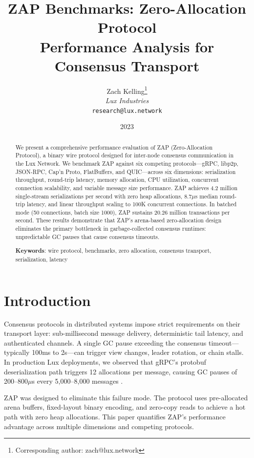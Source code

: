 \documentclass[11pt,letterpaper]{article}
\title{ZAP Benchmarks: Zero-Allocation Protocol\\Performance Analysis for Consensus Transport}
\author{
Zach Kelling\thanks{Corresponding author: zach@lux.network}\\
\textit{Lux Industries}\\
\texttt{research@lux.network}
}
\date{2023}
\begin{document}
\luxcoverpage

\begin{abstract}
We present a comprehensive performance evaluation of ZAP (Zero-Allocation Protocol), a binary wire protocol designed for inter-node consensus communication in the Lux Network. We benchmark ZAP against six competing protocols---gRPC, libp2p, JSON-RPC, Cap'n Proto, FlatBuffers, and QUIC---across six dimensions: serialization throughput, round-trip latency, memory allocation, CPU utilization, concurrent connection scalability, and variable message size performance. ZAP achieves 4.2 million single-stream serializations per second with zero heap allocations, 8.7$\mu$s median round-trip latency, and linear throughput scaling to 100K concurrent connections. In batched mode (50 connections, batch size 1000), ZAP sustains 20.26 million transactions per second. These results demonstrate that ZAP's arena-based zero-allocation design eliminates the primary bottleneck in garbage-collected consensus runtimes: unpredictable GC pauses that cause consensus timeouts.

\textbf{Keywords}: wire protocol, benchmarks, zero allocation, consensus transport, serialization, latency
\end{abstract}

\tableofcontents
\newpage

\section{Introduction}

Consensus protocols in distributed systems impose strict requirements on their transport layer: sub-millisecond message delivery, deterministic tail latency, and authenticated channels. A single GC pause exceeding the consensus timeout---typically 100ms to 2s---can trigger view changes, leader rotation, or chain stalls. In production Lux deployments, we observed that gRPC's protobuf deserialization path triggers 12 allocations per message, causing GC pauses of 200--800$\mu$s every 5,000--8,000 messages \cite{zapwire}.

ZAP was designed to eliminate this failure mode. The protocol uses pre-allocated arena buffers, fixed-layout binary encoding, and zero-copy reads to achieve a hot path with zero heap allocations. This paper quantifies ZAP's performance advantage across multiple dimensions and competing protocols.
\end{document}

